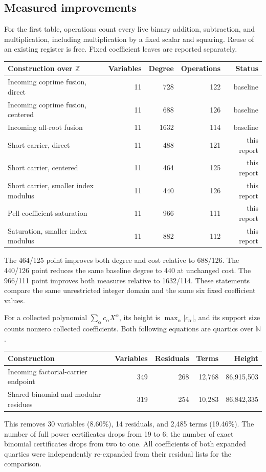 \documentclass[11pt]{article}
\newcommand{\N}{\mathbb N}
\newcommand{\Z}{\mathbb Z}
\theoremstyle{definition}\newtheorem{definition}[theorem]{Definition}
\theoremstyle{remark}\newtheorem{remark}[theorem]{Remark}
\begin{document}
\subsection{Measured improvements}
For the first table, operations count every live binary addition,
subtraction, and multiplication, including multiplication by a fixed
scalar and squaring. Reuse of an existing register is free. Fixed
coefficient leaves are reported separately.
\begin{center}\small
\begin{tabular}{@{}lrrrr@{}}\toprule
Construction over $\Z$ & Variables & Degree & Operations & Status\\\midrule
Incoming coprime fusion, direct &11&728&122&baseline\\
Incoming coprime fusion, centered&11&688&126&baseline\\
Incoming all-root fusion&11&1632&114&baseline\\\midrule
Short carrier, direct&11&488&121&this report\\
Short carrier, centered&11&464&125&this report\\
Short carrier, smaller index modulus&11&440&126&this report\\
Pell-coefficient saturation&11&966&111&this report\\
Saturation, smaller index modulus&11&882&112&this report\\\bottomrule
\end{tabular}
\end{center}
The 464/125 point improves both degree and cost relative to 688/126. The
440/126 point reduces the same baseline degree to 440 at unchanged cost. The
966/111 point improves both measures relative to 1632/114. These statements
compare the same unrestricted integer domain and the same six fixed
coefficient values.

For a collected polynomial $\sum_\alpha c_\alpha X^\alpha$, its height
is $\max_\alpha|c_\alpha|$, and its support size counts nonzero collected
coefficients. Both following equations are quartics over $\N$.
\begin{center}\small
\begin{tabular}{@{}lrrrr@{}}\toprule
Construction&Variables&Residuals&Terms&Height\\\midrule
Incoming factorial-carrier endpoint&349&268&12,768&86,915,503\\
Shared binomial and modular residues&319&254&10,283&86,842,335\\\bottomrule
\end{tabular}
\end{center}
This removes 30 variables (8.60\%), 14 residuals, and 2,485 terms
(19.46\%). The number of full power certificates drops from 19 to 6;
the number of exact binomial certificates drops from two to one. All
coefficients of both expanded quartics were independently re-expanded
from their residual lists for the comparison.
\end{document}
